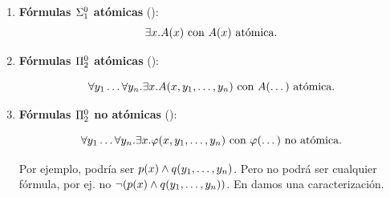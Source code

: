 \begin{enumerate}
    \item \textbf{Fórmulas $\Sigma^0_{1}$ atómicas} ():
    \[
        \exists x . A(x) \text{ con } A(x) \text{ atómica.} 
    \]
    \item \textbf{Fórmulas $\Pi^0_{2}$ atómicas} ():
    
    \[
        \forall y_1 \dots \forall y_n . \exists x . A(x, y_1, \dots, y_n) \text{ con } A(\dots) \text{ atómica}.
    \]

    \item \textbf{Fórmulas $\Pi^0_{2}$ no atómicas} ():
    
    \[
    \forall y_1 \dots \forall y_n . \exists x . \varphi(x, y_1, \dots, y_n) \text{ con } \varphi(\dots) \text{ no atómica}.
    \]
    
    Por ejemplo, podría ser $p(x) \wedge q(y_1, \dots, y_n)$.
    Pero no podrá ser cualquier fórmula, por ej. no $\neg(p(x) \wedge q(y_1, \dots, y_n))$. En  damos una caracterización.
\end{enumerate}

